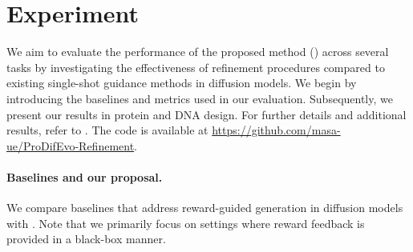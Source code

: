 \vspace{-2mm}
\section{Experiment}\label{sec:experiment}
\vspace{-2mm}
We aim to evaluate the performance of the proposed method (\alg) across several tasks by investigating the effectiveness of refinement procedures compared to existing single-shot guidance methods in diffusion models. We begin by introducing the baselines and metrics used in our evaluation. Subsequently, we present our results in protein and DNA design. For further details and additional results, refer to . The code is available at \href{https://github.com/masa-ue/ProDifEvo-Refinement}{https://github.com/masa-ue/ProDifEvo-Refinement}. 

\vspace{-2mm}
\paragraph{Baselines and our proposal.} We compare baselines that address reward-guided generation in diffusion models with \alg. Note that we primarily focus on settings where reward feedback is provided in a black-box manner. 
\vspace{-2mm}

